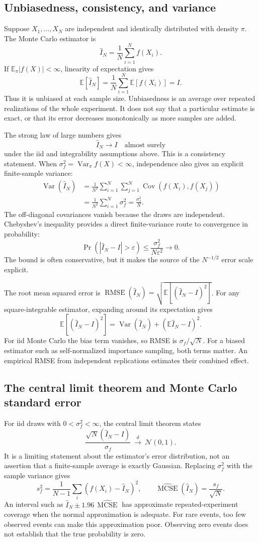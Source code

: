 \documentclass[11pt,a4paper]{article}
\newcommand{\E}{\mathbb E}
\newcommand{\Var}{\operatorname{Var}}
\newcommand{\Cov}{\operatorname{Cov}}
\newcommand{\Normal}{\mathcal N}
\newcommand{\MCSE}{\operatorname{MCSE}}
\begin{document}
\subsection{Unbiasedness, consistency, and variance}
Suppose $X_1,\ldots,X_N$ are independent and identically distributed with density
$\pi$. The Monte Carlo estimator is
\[
 \widehat I_N=\frac1N\sum_{i=1}^N f(X_i).
\]
If $\E_\pi|f(X)|<\infty$, linearity of expectation gives
\[
 \E[\widehat I_N]
 =\frac1N\sum_{i=1}^N\E[f(X_i)]=I.
\]
Thus it is unbiased at each sample size. Unbiasedness is an average over
repeated realizations of the whole experiment. It does not say that a
particular estimate is exact, or that its error decreases monotonically as
more samples are added.

The strong law of large numbers gives
\[
 \widehat I_N\longrightarrow I\quad\text{almost surely}
\]
under the iid and integrability assumptions above. This is a consistency
statement. When $\sigma_f^2=\Var_\pi f(X)<\infty$, independence also gives an
explicit finite-sample variance:
\begin{align*}
 \Var(\widehat I_N)
 &=\frac1{N^2}\sum_{i=1}^N\sum_{j=1}^N
       \Cov(f(X_i),f(X_j))\\
 &=\frac1{N^2}\sum_{i=1}^N\sigma_f^2
 =\frac{\sigma_f^2}{N}.
\end{align*}
The off-diagonal covariances vanish because the draws are independent.
Chebyshev's inequality provides a direct finite-variance route to convergence
in probability:
\[
 \Pr(|\widehat I_N-I|>\varepsilon)
 \le\frac{\sigma_f^2}{N\varepsilon^2}\longrightarrow0.
\]
The bound is often conservative, but it makes the source of the
$N^{-1/2}$ error scale explicit.

The root mean squared error is
$\operatorname{RMSE}(\widehat I_N)=\sqrt{\E[(\widehat I_N-I)^2]}$.
For any square-integrable estimator, expanding around its expectation gives
\[
 \E[(\widehat I_N-I)^2]
 =\Var(\widehat I_N)+(\E\widehat I_N-I)^2.
\]
For iid Monte Carlo the bias term vanishes, so RMSE is $\sigma_f/\sqrt N$.
For a biased estimator such as self-normalized importance sampling, both terms
matter. An empirical RMSE from independent replications estimates their
combined effect.

\subsection{The central limit theorem and Monte Carlo standard error}
For iid draws with $0<\sigma_f^2<\infty$, the central limit theorem states
\[
 \frac{\sqrt N(\widehat I_N-I)}{\sigma_f}
 \ \xrightarrow{d}\ \Normal(0,1).
\]
It is a limiting statement about the estimator's error distribution, not an
assertion that a finite-sample average is exactly Gaussian. Replacing
$\sigma_f^2$ with the sample variance gives
\[
 s_f^2=\frac1{N-1}\sum_i(f(X_i)-\widehat I_N)^2,\qquad
 \widehat{\MCSE}(\widehat I_N)=\frac{s_f}{\sqrt N}.
\]
An interval such as $\widehat I_N\pm1.96\,\widehat{\MCSE}$ has approximate
repeated-experiment coverage when the normal approximation is adequate.
For rare events, too few observed events can make this approximation poor.
Observing zero events does not establish that the true probability is zero.
\end{document}
